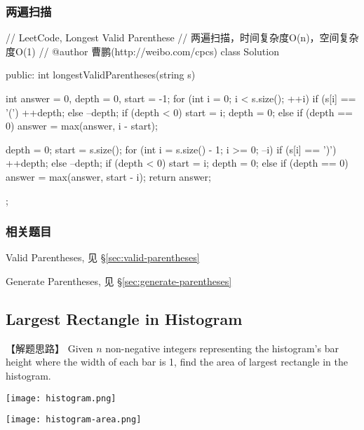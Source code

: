 \subsubsection{两遍扫描}
\begin{Code}
	// LeetCode, Longest Valid Parenthese
	// 两遍扫描，时间复杂度O(n)，空间复杂度O(1)
	// @author 曹鹏(http://weibo.com/cpcs)
	class Solution {
		public:
		int longestValidParentheses(string s) {
			int answer = 0, depth = 0, start = -1;
			for (int i = 0; i < s.size(); ++i) {
				if (s[i] == '(') {
					++depth;
				} else {
				--depth;
				if (depth < 0) {
					start = i;
					depth = 0;
				} else if (depth == 0) {
				answer = max(answer, i - start);
			}
		} 
	}
	
	depth = 0;
	start = s.size();
	for (int i = s.size() - 1; i >= 0; --i) {
		if (s[i] == ')') {
			++depth;
		} else {
		--depth;
		if (depth < 0) {
			start = i;
			depth = 0;
		} else if (depth == 0) {
		answer = max(answer, start - i);
	}
} 
}
return answer;
}
};
\end{Code}


\subsubsection{相关题目}
\begindot
\item Valid Parentheses, 见 \S \ref{sec:valid-parentheses}
\item Generate Parentheses, 见 \S \ref{sec:generate-parentheses}
\myenddot


\subsection{Largest Rectangle in Histogram} %
\label{sec:largest-rectangle-in-histogram}


【解题思路】
Given $n$ non-negative integers representing the histogram's bar height where the width of each bar is 1, find the area of largest rectangle in the histogram.

\begin{center}
	\texttt{[image: histogram.png]}\\
	\label{fig:histogram}
\end{center}

\begin{center}
	\texttt{[image: histogram-area.png]}\\
	\label{fig:histogram-area}
\end{center}

